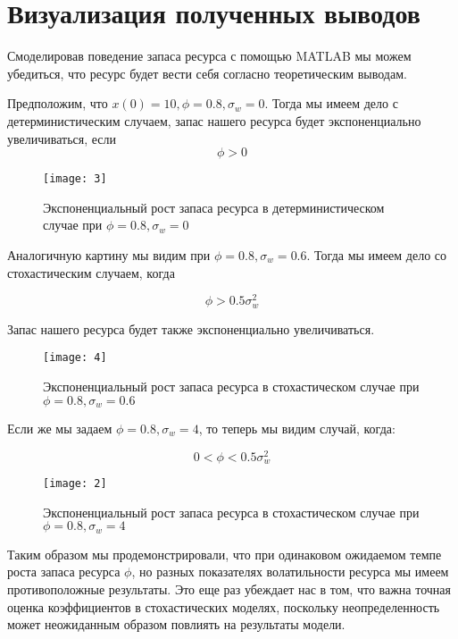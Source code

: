 \documentclass[12pt,a4paper, oneside]{extreport}
\begin{document}
\section{ Визуализация полученных выводов}



Смоделировав поведение запаса ресурса с помощью MATLAB мы можем убедиться, что ресурс будет вести себя согласно теоретическим выводам.

Предположим, что $ x(0) = 10, \phi = 0.8, \sigma_w = 0  $.  Тогда мы имеем дело с детерминистическим случаем, запас нашего ресурса будет экспоненциально увеличиваться, если 
\[  \phi > 0  \] 



\begin{figure}[h]
	\centering
	\texttt{[image: 3]}
	\caption{Экспоненциальный рост запаса ресурса в детерминистическом случае при $  \phi = 0.8, \sigma_w = 0  $ }
	\label{fig:eosgj}
\end{figure}

\newpage

Аналогичную картину мы видим при  $  \phi = 0.8, \sigma_w = 0.6  $.  Тогда мы имеем дело со стохастическим  случаем, когда

\[  \phi >  0.5 \sigma^2_w   \]

Запас нашего ресурса будет также экспоненциально увеличиваться. 


\begin{figure}[h]
	\centering
	\texttt{[image: 4]}
	\caption{Экспоненциальный рост запаса ресурса в стохастическом  случае при $  \phi = 0.8, \sigma_w = 0.6  $ }
	\label{fig:eosgj}
\end{figure}

\newpage

Если же мы задаем  $  \phi = 0.8, \sigma_w = 4  $, то теперь мы видим случай, когда:

\[  0 < \phi <  0.5 \sigma^2_w  \]



\begin{figure}[h]
	\centering
	\texttt{[image: 2]}
	\caption{Экспоненциальный рост запаса ресурса в стохастическом  случае при $  \phi = 0.8, \sigma_w = 4  $ }
	\label{fig:eosgj}
\end{figure}


Таким образом мы продемонстрировали, что при одинаковом ожидаемом темпе роста запаса ресурса $ \phi $,  но разных показателях волатильности  ресурса мы  имеем противоположные результаты. Это еще раз убеждает нас в том, что важна точная  оценка коэффициентов в стохастических моделях, поскольку неопределенность может неожиданным образом повлиять на результаты модели.   
\end{document}
